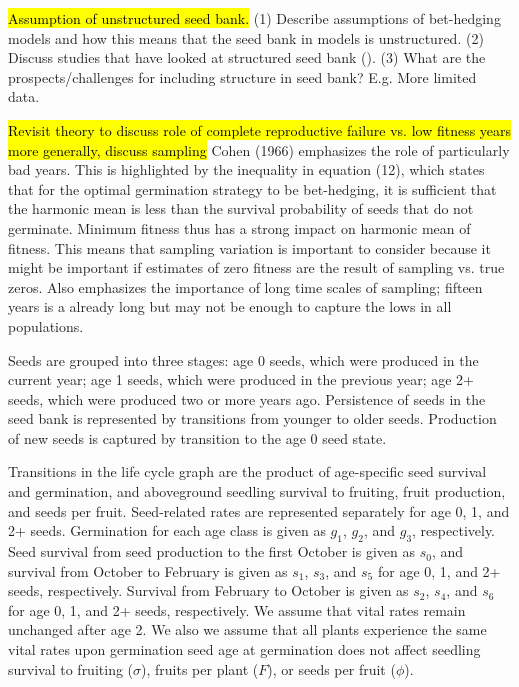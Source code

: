 \documentclass[12pt, oneside, titlepage]{article}   	%
\begin{document}
\hl{Assumption of unstructured seed bank.} (1) Describe assumptions of bet-hedging models and how this means that the seed bank in models is unstructured. (2) Discuss studies that have looked at structured seed bank (\cite{philippi1993a}). (3) What are the prospects/challenges for including structure in seed bank? E.g. More limited data.

\hl{Revisit theory to discuss role of complete reproductive failure vs. low fitness years more generally, discuss sampling} Cohen (1966) emphasizes the role of particularly bad years. This is highlighted by the inequality in equation (12), which states that for the optimal germination strategy to be bet-hedging, it is sufficient that the harmonic mean is less than the survival probability of seeds that do not germinate. Minimum fitness thus has a strong impact on harmonic mean of fitness. This means that sampling variation is important to consider because it might be important if estimates of zero fitness are the result of sampling vs. true zeros. Also emphasizes the importance of long time scales of sampling; fifteen years is a already long but may not be enough to capture the lows in all populations. 


\iffalse

 Seeds are grouped into three stages: age 0 seeds, which were produced in the current year; age 1 seeds, which were produced in the previous year; age 2+ seeds, which were produced two or more years ago. Persistence of seeds in the seed bank is represented by transitions from younger to older seeds. Production of new seeds is captured by transition to the age 0 seed state. 
 
Transitions in the life cycle graph are the product of age-specific seed survival and germination, and aboveground seedling survival to fruiting, fruit production, and seeds per fruit. Seed-related rates are represented separately for age 0, 1, and 2+ seeds. Germination for each age class is given as $g_1$, $g_2$, and $g_3$, respectively. Seed survival from seed production to the first October is given as $s_0$, and survival from October to February is given as $s_1$, $s_3$, and $s_5$ for age 0, 1, and 2+ seeds, respectively. Survival from February to October is given as $s_2$, $s_4$, and $s_6$ for age 0, 1, and 2+ seeds, respectively. We assume that vital rates remain unchanged after age 2. We also we assume that all plants experience the same vital rates upon germination seed age at germination does not affect seedling survival to fruiting ($\sigma$), fruits per plant ($F$), or seeds per fruit ($\phi$).
\end{document}

